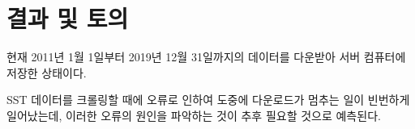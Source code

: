 \section{결과 및 토의}

현재 2011년 1월 1일부터 2019년 12월 31일까지의 데이터를 다운받아 서버 컴퓨터에 저장한 상태이다. 

SST 데이터를 크롤링할 때에 오류로 인하여 도중에 다운로드가 멈추는 일이 빈번하게 일어났는데, 이러한 오류의 원인을 파악하는 것이 추후 필요할 것으로 예측된다. 